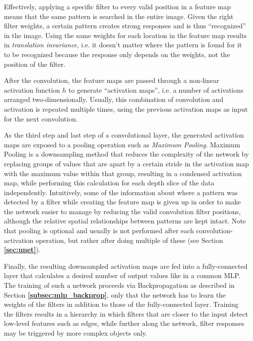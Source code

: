 Effectively, applying a specific filter to every valid position in a feature map means that the same pattern is searched in the entire image. Given the right filter weights, a certain pattern creates strong responses and is thus ``recognized'' in the image. Using the same weights for each location in the feature map results in \textit{translation invariance}, i.e. it doesn't matter where the pattern is found for it to be recognized because the response only depends on the weights, not the position of the filter.

After the convolution, the feature maps are passed through a non-linear activation function $h$ to generate ``activation maps'', i.e. a number of activations arranged two-dimensionally. Usually, this combination of convolution and activation is repeated multiple times, using the previous activation maps as input for the next convolution.

\noindent As the third step and last step of a convolutional layer, the generated activation maps are exposed to a pooling operation such as \textit{Maximum Pooling}. Maximum Pooling is a downsampling method that reduces the complexity of the network by replacing groups of values that are apart by a certain stride in the activation map with the maximum value within that group, resulting in a condensed activation map, while performing this calculation for each depth slice of the data independently. Intuitively, some of the information about where a pattern was detected by a filter while creating the feature map is given up in order to make the network easier to manage by reducing the valid convolution filter positions, although the relative spatial relationships between patterns are kept intact. Note that pooling is optional and usually is not performed after each convolution-activation operation, but rather after doing multiple of these (see Section \textbf{\ref{sec:unet}}).

Finally, the resulting downsampled activation maps are fed into a fully-connected layer that calculates a desired number of output values like in a common MLP. \cite[pp. 330-345]{deeplearning_book}\\

\noindent The training of such a network proceeds via Backpropagation as described in Section \textbf{\ref{subsec:mlp_backprop}}, only that the network has to learn the weights of the filters in addition to those of the fully-connected layer. Training the filters results in a hierarchy in which filters that are closer to the input detect low-level features such as edges, while further along the network, filter responses may be triggered by more complex objects only.\\

